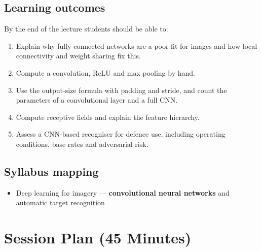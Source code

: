 \documentclass[11pt]{article}
\begin{document}
\subsection*{Learning outcomes}By the end of the lecture students should be able to:\begin{enumerate}\item Explain why fully-connected networks are a poor fit for images and how local connectivity and weight sharing fix this.\item Compute a convolution, ReLU and max pooling by hand.\item Use the output-size formula with padding and stride, and count the parameters of a convolutional layer and a full CNN.\item Compute receptive fields and explain the feature hierarchy.\item Assess a CNN-based recogniser for defence use, including operating conditions, base rates and adversarial risk.\end{enumerate}

\subsection*{Syllabus mapping}\begin{itemize}\item Deep learning for imagery --- \textbf{convolutional neural networks} and automatic target recognition\end{itemize}

\section{Session Plan (45 Minutes)}
\end{document}

